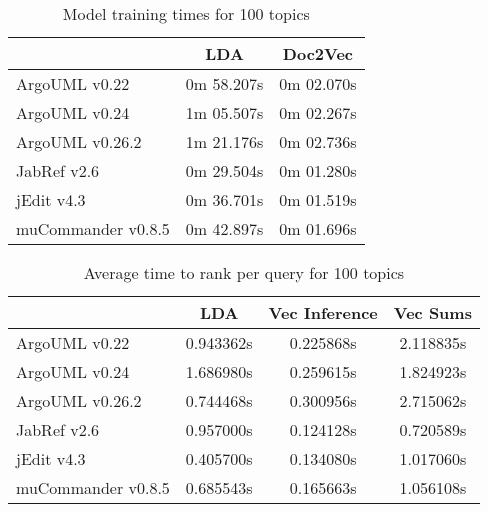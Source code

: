 \begin{table}
\centering
\begin{tabular}{lcc}
\toprule
                {} & LDA    & Doc2Vec \\
\midrule
ArgoUML v0.22      &  0m 58.207s     &  0m 02.070s     \\
ArgoUML v0.24      &  1m 05.507s     &  0m 02.267s     \\
ArgoUML v0.26.2    &  1m 21.176s     &  0m 02.736s     \\
JabRef v2.6        &  0m 29.504s     &  0m 01.280s     \\
jEdit v4.3         &  0m 36.701s     &  0m 01.519s     \\
muCommander v0.8.5 &  0m 42.897s     &  0m 01.696s     \\
\bottomrule
\end{tabular}
\caption{Model training times for 100 topics}
\label{tab:trainingtimes}
\end{table}


\begin{table}
\centering
\begin{tabular}{lccc}
\toprule
                {} & LDA    & Vec Inference & Vec Sums \\
\midrule
ArgoUML v0.22      & 0.943362s      &  0.225868s     &  2.118835s         \\
ArgoUML v0.24      & 1.686980s      &  0.259615s     &  1.824923s         \\
ArgoUML v0.26.2    & 0.744468s      &  0.300956s     &  2.715062s         \\
JabRef v2.6        & 0.957000s      &  0.124128s     &  0.720589s         \\
jEdit v4.3         & 0.405700s      &  0.134080s     &  1.017060s         \\
muCommander v0.8.5 & 0.685543s      &  0.165663s     &  1.056108s         \\
\bottomrule
\end{tabular}
\caption{Average time to rank per query for 100 topics}
\label{tab:querytimes}
\end{table}
